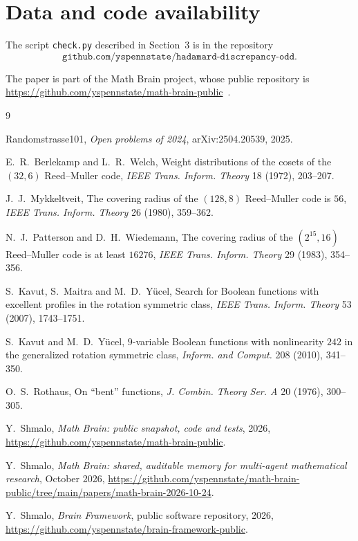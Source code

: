 \documentclass[11pt]{amsart}
\theoremstyle{remark}
\begin{document}
\section*{Data and code availability}

The script \texttt{check.py} described in Section~3 is in the repository
\[
\texttt{github.com/yspennstate/hadamard-discrepancy-odd}.
\]

The paper is part of the Math Brain project, whose public repository is \url{https://github.com/yspennstate/math-brain-public}~\cite{MathBrainRepo}.

\begin{thebibliography}{9}

Randomstrasse101, \emph{Open problems of 2024}, arXiv:2504.20539, 2025.

E.~R.~Berlekamp and L.~R.~Welch, Weight distributions of the cosets of the
$(32,6)$ Reed--Muller code, \emph{IEEE Trans. Inform. Theory} 18 (1972), 203--207.

J.~J.~Mykkeltveit, The covering radius of the $(128,8)$ Reed--Muller code is $56$,
\emph{IEEE Trans. Inform. Theory} 26 (1980), 359--362.

N.~J.~Patterson and D.~H.~Wiedemann, The covering radius of the $(2^{15},16)$
Reed--Muller code is at least $16276$, \emph{IEEE Trans. Inform. Theory} 29 (1983),
354--356.

S.~Kavut, S.~Maitra and M.~D.~Y\"ucel, Search for Boolean functions with excellent
profiles in the rotation symmetric class, \emph{IEEE Trans. Inform. Theory} 53 (2007),
1743--1751.

S.~Kavut and M.~D.~Y\"ucel, $9$-variable Boolean functions with nonlinearity $242$
in the generalized rotation symmetric class, \emph{Inform. and Comput.} 208 (2010),
341--350.

O.~S.~Rothaus, On ``bent'' functions, \emph{J. Combin. Theory Ser. A} 20 (1976),
300--305.

 Y.~Shmalo, \emph{Math Brain: public snapshot, code and tests}, 2026, \url{https://github.com/yspennstate/math-brain-public}.

 Y.~Shmalo, \emph{Math Brain: shared, auditable memory for multi-agent mathematical research}, October 2026, \url{https://github.com/yspennstate/math-brain-public/tree/main/papers/math-brain-2026-10-24}.

 Y.~Shmalo, \emph{Brain Framework}, public software repository, 2026, \url{https://github.com/yspennstate/brain-framework-public}.

\end{thebibliography}
\end{document}
